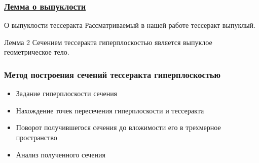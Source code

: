 \documentclass[10pt,pdf,hyperref={unicode}]{beamer}
\begin{document}
\begin{frame}
	\frametitle{\hyperlink{vipuk}{Лемма о выпуклости}}
	\hypertarget{vipuk_back}{}

	\begin{alertblock}{О выпуклости тессеракта}
		Рассматриваемый в нашей работе тессеракт выпуклый.
	\end{alertblock}

	\begin{block}{Лемма 2}
		Сечением тессеракта гиперплоскостью является выпуклое геометрическое тело.
	\end{block}
\end{frame}
\begin{frame}
	\frametitle{Метод построения сечений тессеракта гиперплоскостью}
	\begin{itemize}
		\item Задание гиперплоскости сечения
		\item Нахождение точек пересечения гиперплоскости и тессеракта
		\item Поворот получившегося сечения до вложимости его в трехмерное пространство
		\item Анализ полученного сечения
	\end{itemize}
\end{frame}
\end{document}
